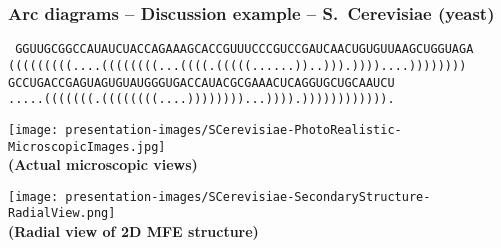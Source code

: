 \documentclass[usenames,svgnames,dvipsnames,11pt]{beamer}
\begin{document}
\begin{frame}[fragile]
\frametitle{Arc diagrams -- Discussion example -- S.~Cerevisiae (yeast)}

\noindent
{\small\tt 
GGUUGCGGCCAUAUCUACCAGAAAGCACCGUUUCCCGUCCGAUCAACUGUGUUAAGCUGGUAGA \\[0.05cm]
{\color{red}(((((((((}....{\color{orange}((((((((}...{\color{yellow!75!black}((((}.{\color{green}(((}{\color{blue}((}......{\color{blue}))}..{\color{green})))}.{\color{yellow!75!black}))))}....{\color{orange}))))))))} \\[0.1cm]
GCCUGACCGAGUAGUGUAUGGGUGACCAUACGCGAAACUCAGGUGCUGCAAUCU \\[0.05cm]
.....{\color{orange}(((((((}.{\color{yellow!75!black}((((((((}....{\color{yellow!75!black}))))))))}...{\color{orange}))))}.{\color{orange})))}{\color{red})))))))))}.
}

\bigskip

\begin{minipage}{0.4\textwidth}
\begin{center}
\texttt{[image: presentation-images/SCerevisiae-PhotoRealistic-MicroscopicImages.jpg]} \\ 
\textbf{(Actual microscopic views)}
\end{center}
\end{minipage}\hfil
\begin{minipage}{0.58\textwidth}
\begin{center}
\texttt{[image: presentation-images/SCerevisiae-SecondaryStructure-RadialView.png]} \\ 
\textbf{(Radial view of 2D MFE structure)} 
\end{center}
\end{minipage}

\end{frame}
\end{document}
